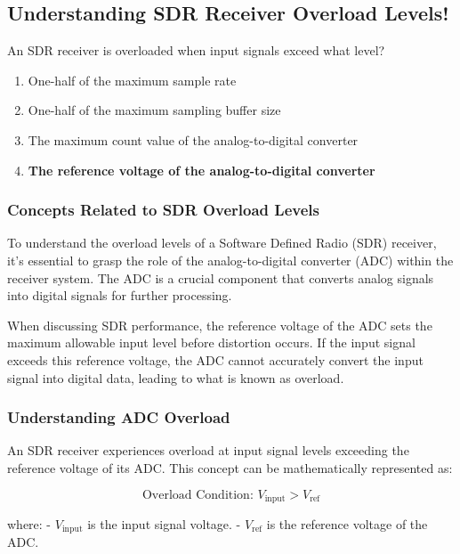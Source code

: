 \subsection{Understanding SDR Receiver Overload Levels!}

\begin{tcolorbox}[colback=gray!10, colframe=black, title=E4C08`]
An SDR receiver is overloaded when input signals exceed what level? 

\begin{enumerate}[label=\Alph*.]
    \item One-half of the maximum sample rate
    \item One-half of the maximum sampling buffer size
    \item The maximum count value of the analog-to-digital converter
    \item \textbf{The reference voltage of the analog-to-digital converter}
\end{enumerate} \end{tcolorbox}

\subsubsection{Concepts Related to SDR Overload Levels}

To understand the overload levels of a Software Defined Radio (SDR) receiver, it's essential to grasp the role of the analog-to-digital converter (ADC) within the receiver system. The ADC is a crucial component that converts analog signals into digital signals for further processing. 

When discussing SDR performance, the reference voltage of the ADC sets the maximum allowable input level before distortion occurs. If the input signal exceeds this reference voltage, the ADC cannot accurately convert the input signal into digital data, leading to what is known as overload.

\subsubsection{Understanding ADC Overload}

An SDR receiver experiences overload at input signal levels exceeding the reference voltage of its ADC. This concept can be mathematically represented as:

\[
\text{Overload Condition: } V_{\text{input}} > V_{\text{ref}}
\]

where:
- \( V_{\text{input}} \) is the input signal voltage.
- \( V_{\text{ref}} \) is the reference voltage of the ADC.

